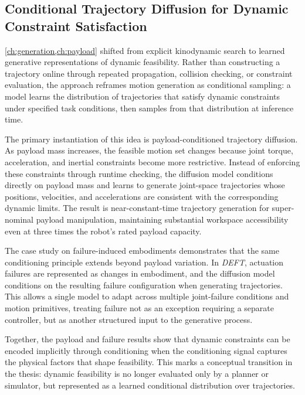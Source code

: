 \subsection{Conditional Trajectory Diffusion for Dynamic Constraint Satisfaction}
\label{sec:discussion:diffusion}

\cref{ch:generation,ch:payload} shifted from explicit kinodynamic search to learned generative representations of dynamic feasibility.
Rather than constructing a trajectory online through repeated propagation, collision checking, or constraint evaluation, the approach reframes motion generation as conditional sampling: a model learns the distribution of trajectories that satisfy dynamic constraints under specified task conditions, then samples from that distribution at inference time.

The primary instantiation of this idea is payload-conditioned trajectory diffusion.
As payload mass increases, the feasible motion set changes because joint torque, acceleration, and inertial constraints become more restrictive.
Instead of enforcing these constraints through runtime checking, the diffusion model conditions directly on payload mass and learns to generate joint-space trajectories whose positions, velocities, and accelerations are consistent with the corresponding dynamic limits.
The result is near-constant-time trajectory generation for super-nominal payload manipulation, maintaining substantial workspace accessibility even at three times the robot's rated payload capacity.

The case study on failure-induced embodiments demonstrates that the same conditioning principle extends beyond payload variation.
In \textit{DEFT}, actuation failures are represented as changes in embodiment, and the diffusion model conditions on the resulting failure configuration when generating trajectories.
This allows a single model to adapt across multiple joint-failure conditions and motion primitives, treating failure not as an exception requiring a separate controller, but as another structured input to the generative process.

Together, the payload and failure results show that dynamic constraints can be encoded implicitly through conditioning when the conditioning signal captures the physical factors that shape feasibility.
This marks a conceptual transition in the thesis: dynamic feasibility is no longer evaluated only by a planner or simulator, but represented as a learned conditional distribution over trajectories.

